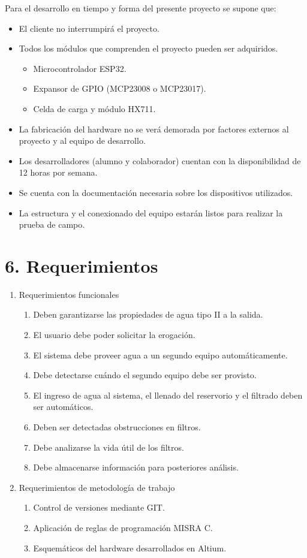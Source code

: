 \documentclass[
11pt, %
]{charter}
\begin{document}
Para el desarrollo en tiempo y forma del presente proyecto se supone que:
\begin{itemize}
	\item El cliente no interrumpirá el proyecto.
	\item Todos los módulos que comprenden el proyecto pueden ser adquiridos.
	\begin{itemize}
		\item Microcontrolador ESP32.
		\item Expansor de GPIO (MCP23008 o MCP23017).
		\item Celda de carga y módulo HX711.
	\end{itemize}
	\item La fabricación del hardware no se verá demorada por factores externos al proyecto y al equipo de desarrollo.
	\item Los desarrolladores (alumno y colaborador) cuentan con la disponibilidad de 12 horas por semana.
	\item Se cuenta con la documentación necesaria sobre los dispositivos utilizados.
	\item La estructura y el conexionado del equipo estarán listos para realizar la prueba de campo.
\end{itemize}

\section{6. Requerimientos}
\label{sec:requerimientos}

\begin{enumerate}
	\item Requerimientos funcionales
		\begin{enumerate}
			\item Deben garantizarse las propiedades de agua tipo II a la salida.
			\item El usuario debe poder solicitar la erogación.
			\item El sistema debe proveer agua a un segundo equipo automáticamente.
			\item Debe detectarse cuándo el segundo equipo debe ser provisto.
			\item El ingreso de agua al sistema, el llenado del reservorio y el filtrado deben ser automáticos.
			\item Deben ser detectadas obstrucciones en filtros.
			\item Debe analizarse la vida útil de los filtros.
			\item Debe almacenarse información para posteriores análisis.
		\end{enumerate}
	\item Requerimientos de metodología de trabajo
		\begin{enumerate}
			\item Control de versiones mediante GIT.
			\item Aplicación de reglas de programación MISRA C.
			\item Esquemáticos del hardware desarrollados en Altium.
		\end{enumerate}
\end{enumerate}
\end{document}
